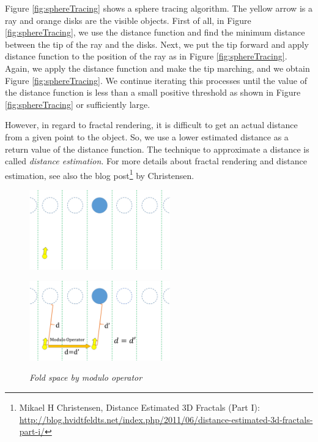 Figure \ref{fig:sphereTracing} shows a sphere tracing algorithm.
The yellow arrow is a ray and orange disks are the visible objects.
First of all, in Figure \ref{fig:sphereTracing},
we use the distance function and find the minimum distance between
the tip of the ray and the disks.
Next, we put the tip forward and apply distance function to the position
of the ray as in Figure \ref{fig:sphereTracing}.
Again, we apply the distance function and make the tip marching, and we obtain
Figure \ref{fig:sphereTracing}.
We continue iterating this processes until the value of the distance
function is less than a small positive threshold as shown in Figure
\ref{fig:sphereTracing} or sufficiently large.

However, in regard to fractal rendering, it is difficult to
get an actual distance from a given point to the object.
So, we use a lower estimated distance
as a return value of the distance function. The technique to approximate
a distance is called \textit{distance estimation}.
For more details about fractal rendering and distance estimation, see also the blog
post\footnote{Mikael H Christensen, Distance Estimated 3D Fractals (Part I):\\ \quad\quad
\url{http://blog.hvidtfeldts.net/index.php/2011/06/distance-estimated-3d-fractals-part-i/}}
by Christensen. 

\begin{figure}[htbp]
 \begin{minipage}[t]{0.5\hsize}
  \center
  \includegraphics[height=1.35in, keepaspectratio]{img/visualization/translate1.png}
  \subcaption{\textit{}}
  \label{fig:modulo1}
  \hspace*{\fill}
 \end{minipage}
 \begin{minipage}[t]{0.5\hsize}
  \center
  \includegraphics[height=1.35in, keepaspectratio]{img/visualization/translate2.png}
  \subcaption{\textit{}}
  \label{fig:modulo2}
  \hspace*{\fill}
 \end{minipage}
 \caption{\textit{Fold space by modulo operator}}
 \label{fig:moduloAll}
\end{figure}

